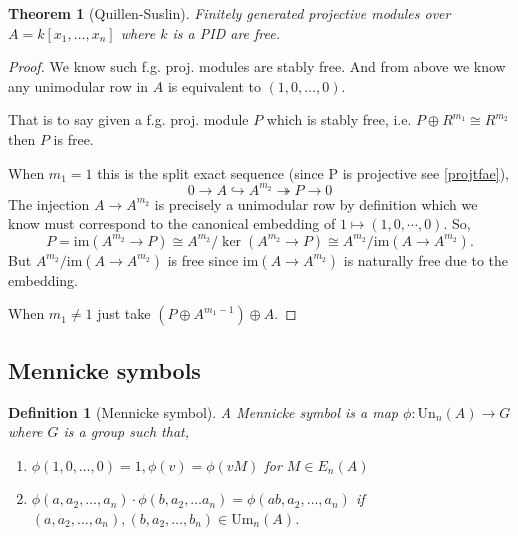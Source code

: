 \documentclass[12pt]{article}
\numberwithin{equation}{section}
\newcounter{dummy} \numberwithin{dummy}{section}
\newtheorem{theorem}[dummy]{Theorem}
\newtheorem{definition}[dummy]{Definition}
\begin{document}
	
	
	\begin{theorem}[Quillen-Suslin]
		Finitely generated projective modules over $A=k[x_1,\dots,x_n]$ where $k$ is a PID are free.
	\end{theorem}
	\begin{proof}
		We know such f.g. proj. modules are stably free. And from above we know any unimodular row in $A$ is equivalent to $(1,0,\dots,0)$.
		
		That is to say given a f.g. proj. module $P$ which is stably free, i.e. $P \oplus R^{m_1} \cong R^{m_2}$ then $P$ is free.
		
		When $m_1=1$ this is the split exact sequence (since P is projective see \ref{projtfae}),
		\[ 0 \to A \hookrightarrow A^{m_2}  \twoheadrightarrow P \to 0 \]
		The injection $A \to A^{m_2}$ is precisely a unimodular row by definition which we know must correspond to the canonical embedding of $1 \mapsto (1,0,\cdots, 0)$.
		So,$$P = \mathrm{im}(A^{m_2} \to P) \cong A^{m_2}/\ker (A^{m_2} \to P) \cong A^{m_2}/\mathrm{im}(A \to A^{m_2}).$$
		But $A^{m_2}/\mathrm{im}(A \to A^{m_2})$ is free since $\mathrm{im}(A \to A^{m_2})$ is naturally free due to the embedding.
		
		When $m_1 \neq 1$ just take $(P \oplus A^{m_1-1}) \oplus A$.
	\end{proof}
	\subsection{Mennicke symbols}
	\begin{definition}[Mennicke symbol]
		A Mennicke symbol is a map $\phi : \mathrm{Un}_{n}(A) \to G $ where $G$ is a group such that,
		\begin{enumerate}
			\item $\phi(1,0,\dots, 0)=1, \phi(v)=\phi(v M)$ for $M \in E_n(A)$
			\item $\phi(a,a_2,\dots,a_n)\cdot \phi(b,a_2, \dots a_n)=\phi(ab,a_2,\dots, a_n)$ if $(a,a_2,\dots,a_n), (b,a_2,\dots,b_n) \in \mathrm{Um}_n(A)$.
		\end{enumerate}
	\end{definition}

	
\end{document}

